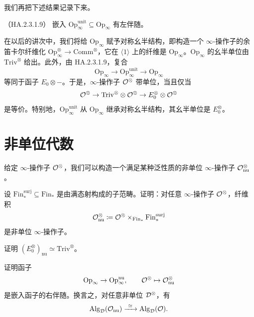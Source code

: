 
\nitem\label{L22-3.16} 我们再把下述结果记录下来。

\begin{proposition}\label{L22-3.17}（HA.2.3.1.9）
嵌入 $\mathrm{Op}_{\infty}^{\mathrm{unit}}\subseteq\mathrm{Op}_{\infty}$ 有左伴随。
\end{proposition}

\begin{remark}\label{L22-3.18}
在以后的讲次中，我们将给 $\mathrm{Op}_{\infty}$ 赋予对称幺半结构，即构造一个 $\infty$-操作子的余笛卡尔纤维化 $\mathrm{Op}_{\infty}^{\otimes}\to\mathrm{Comm}^{\otimes}$，它在 $\langle1\rangle$ 上的纤维是 $\mathrm{Op}_{\infty}$。$\mathrm{Op}_{\infty}$ 的幺半单位由 $\mathrm{Triv}^{\otimes}$ 给出。此外，由 HA.2.3.1.9，复合
\[
\mathrm{Op}_{\infty}\to\mathrm{Op}_{\infty}^{\mathrm{unit}}\to\mathrm{Op}_{\infty}
\]
等同于函子 $E_{0}\otimes-$。于是，$\infty$-操作子 $\mathcal{O}^{\otimes}$ 带单位，当且仅当
\[
\mathcal{O}^{\otimes}\to\mathrm{Triv}^{\otimes}\otimes\mathcal{O}^{\otimes}\to E_{0}^{\otimes}\otimes\mathcal{O}^{\otimes}
\]
是等价。特别地，$\mathrm{Op}_{\infty}^{\mathrm{unit}}$ 从 $\mathrm{Op}_{\infty}$ 继承对称幺半结构，其幺半单位是 $E_{0}^{\otimes}$。
\end{remark}

\section{非单位代数}

\nitem\label{L22-4.1} 给定 $\infty$-操作子 $\mathcal{O}^{\otimes}$，我们可以构造一个满足某种泛性质的非单位 $\infty$-操作子 $\mathcal{O}^{\otimes}_{\mathrm{nu}}$。

\begin{exercise}\label{L22-4.2}
设 $\mathrm{Fin}_{*}^{\mathrm{surj}}\subseteq\mathrm{Fin}_{*}$ 是由满态射构成的子范畴。证明：对任意 $\infty$-操作子 $\mathcal{O}^{\otimes}$，纤维积
\[
\mathcal{O}^{\otimes}_{\mathrm{nu}}\coloneqq\mathcal{O}^{\otimes}\times_{\mathrm{Fin}_{*}}\mathrm{Fin}_{*}^{\mathrm{surj}}
\]
是非单位 $\infty$-操作子。
\end{exercise}

\begin{exercise}\label{L22-4.3}
证明 $(E_{0}^{\otimes})_{\mathrm{nu}}\simeq\mathrm{Triv}^{\otimes}$。
\end{exercise}

\begin{exercise}\label{L22-4.4}
证明函子
\[
\mathrm{Op}_{\infty}\to\mathrm{Op}_{\infty}^{\mathrm{nu}},\qquad \mathcal{O}^{\otimes}\mapsto\mathcal{O}^{\otimes}_{\mathrm{nu}}
\]
是嵌入函子的右伴随。换言之，对任意非单位 $\mathcal{D}^{\otimes}$，有
\[
\Alg_{\cD}(\OO_{\mathrm{nu}})\xrightarrow{\ \simeq\ }\Alg_{\cD}(\OO).
\]
\end{exercise}

